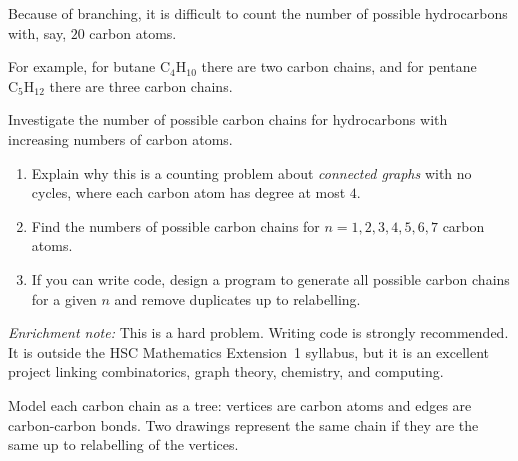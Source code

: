 \begin{problem}
Because of branching, it is difficult to count the number of possible hydrocarbons with, say, $20$ carbon atoms.

For example, for butane $\mathrm{C}_4\mathrm{H}_{10}$ there are two carbon chains, and for pentane $\mathrm{C}_5\mathrm{H}_{12}$ there are three carbon chains.

Investigate the number of possible carbon chains for hydrocarbons with increasing numbers of carbon atoms.

\begin{enumerate}[label=\alph*)]
\item Explain why this is a counting problem about \emph{connected graphs} with no cycles, where each carbon atom has degree at most $4$.
\item Find the numbers of possible carbon chains for $n=1,2,3,4,5,6,7$ carbon atoms.
\item If you can write code, design a program to generate all possible carbon chains for a given $n$ and remove duplicates up to relabelling.
\end{enumerate}

\noindent\textit{Enrichment note:} This is a hard problem. Writing code is strongly recommended. It is outside the HSC Mathematics Extension~1 syllabus, but it is an excellent project linking combinatorics, graph theory, chemistry, and computing.
\end{problem}

\begin{hint}
Model each carbon chain as a tree: vertices are carbon atoms and edges are carbon-carbon bonds. Two drawings represent the same chain if they are the same up to relabelling of the vertices.
\end{hint}

